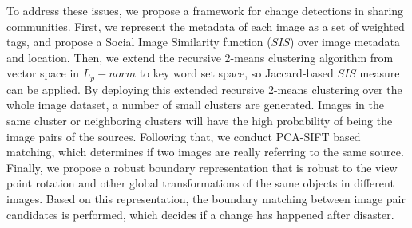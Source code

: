 \documentclass[runningheads,a4paper]{llncs}
\newcommand{\yongli}{\todo[author=YL,color=green,inline]}
\newcommand{\eat}[1]{}
\begin{document}
\eat{\yongli{Explain why time cost is a issue for them?}
Another limitation is the unstable/unrelated images.
The social media image features are made by the up-loader and
this human inputs make the unstable/unrelated images.
\yongli{are we solving this?}
The image rotation, resolution and the quality of the images also the concern of the limitation.
}



To address these issues, we propose a framework for change detections in sharing communities. First, we represent the metadata of each image as a set of weighted tags, and propose a Social Image Similarity function ($SIS$) over image metadata and location. 
Then, we extend the recursive 2-means clustering algorithm \cite{} \yongli{Should we add this citation now?} from vector space in $L_p-norm$ to key word set space, so Jaccard-based $SIS$ measure can be applied. By deploying this extended recursive 2-means clustering over the whole image dataset, a number of small clusters are generated. Images in the same cluster or neighboring clusters will have the high probability of being the image pairs of the sources. Following that, we conduct PCA-SIFT based matching, which determines if two images are really referring to the same source. Finally, we propose a robust boundary representation that is robust to the view point rotation and other global transformations of the same objects in different images. Based on this representation, the boundary matching between image pair candidates is performed, which decides if a change has happened after disaster.
\end{document}

